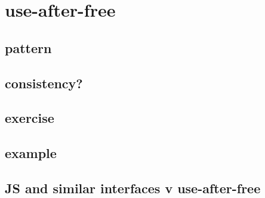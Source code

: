 \section{use-after-free}


\subsection{pattern}


\subsection{consistency?}


\subsection{exercise}


\subsection{example}


\subsection{JS and similar interfaces v use-after-free}

